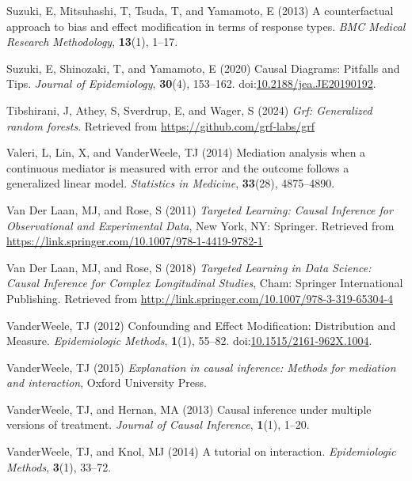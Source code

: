 \documentclass[
  single column]{article}
\newlength{\cslhangindent}
\newenvironment{CSLReferences}[2] %
 {\begin{list}{}{%
  \setlength{\itemindent}{0pt}
  \setlength{\leftmargin}{0pt}
  \setlength{\parsep}{0pt}
  \ifodd #1
   \setlength{\leftmargin}{\cslhangindent}
   \setlength{\itemindent}{-1\cslhangindent}
  \fi
  \setlength{\itemsep}{#2\baselineskip}}}
 {\end{list}}
\begin{document}
\begin{CSLReferences}{1}{0}
Suzuki, E, Mitsuhashi, T, Tsuda, T, and Yamamoto, E (2013) A
counterfactual approach to bias and effect modification in terms of
response types. \emph{BMC Medical Research Methodology}, \textbf{13}(1),
1--17.

Suzuki, E, Shinozaki, T, and Yamamoto, E (2020) Causal Diagrams:
Pitfalls and Tips. \emph{Journal of Epidemiology}, \textbf{30}(4),
153--162.
doi:\href{https://doi.org/10.2188/jea.JE20190192}{10.2188/jea.JE20190192}.

Tibshirani, J, Athey, S, Sverdrup, E, and Wager, S (2024) \emph{Grf:
Generalized random forests}. Retrieved from
\url{https://github.com/grf-labs/grf}

Valeri, L, Lin, X, and VanderWeele, TJ (2014) Mediation analysis when a
continuous mediator is measured with error and the outcome follows a
generalized linear model. \emph{Statistics in Medicine},
\textbf{33}(28), 4875--4890.

Van Der Laan, MJ, and Rose, S (2011) \emph{Targeted Learning: Causal
Inference for Observational and Experimental Data}, New York, NY:
Springer. Retrieved from
\url{https://link.springer.com/10.1007/978-1-4419-9782-1}

Van Der Laan, MJ, and Rose, S (2018) \emph{Targeted Learning in Data
Science: Causal Inference for Complex Longitudinal Studies}, Cham:
Springer International Publishing. Retrieved from
\url{http://link.springer.com/10.1007/978-3-319-65304-4}

VanderWeele, TJ (2012) Confounding and Effect Modification: Distribution
and Measure. \emph{Epidemiologic Methods}, \textbf{1}(1), 55--82.
doi:\href{https://doi.org/10.1515/2161-962X.1004}{10.1515/2161-962X.1004}.

VanderWeele, TJ (2015) \emph{Explanation in causal inference: Methods
for mediation and interaction}, Oxford University Press.

VanderWeele, TJ, and Hernan, MA (2013) Causal inference under multiple
versions of treatment. \emph{Journal of Causal Inference},
\textbf{1}(1), 1--20.

VanderWeele, TJ, and Knol, MJ (2014) A tutorial on interaction.
\emph{Epidemiologic Methods}, \textbf{3}(1), 33--72.


\end{CSLReferences}
\end{document}
